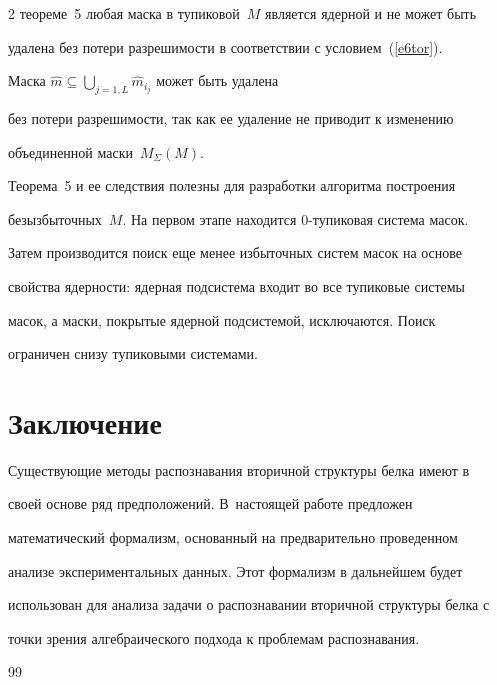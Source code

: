 \begin{multicols}{2}
теореме~5 любая маска в тупиковой~$M$ является ядерной и не может быть 

удалена без потери разрешимости в соответствии с условием~(\ref{e6tor}). 

Маска $\hat{m}\subseteq \bigcup\limits_{j=1,L} \hat{m}_{i_j}$ может быть удалена 

без потери разрешимости, так как ее удаление не приводит к изменению 

объединенной маски~$M_\Sigma (M)$.



\medskip



    Теорема~5 и ее следствия полезны для разработки алгоритма построения 

безызбыточных~$M$. На первом этапе находится 0-тупиковая система масок. 

Затем производится поиск еще менее избыточных систем масок на основе 

свойства ядерности: ядерная подсистема входит во все тупиковые системы 

масок, а маски, покрытые ядерной подсистемой, исключаются. Поиск 

ограничен снизу тупиковыми системами. 



\section{Заключение}



Существующие методы распознавания вторичной структуры белка имеют в 

своей основе ряд предположений. В~настоящей работе предложен 

математический формализм, основанный на предварительно проведенном 

анализе экспериментальных данных. Этот формализм в дальнейшем будет 

использован для анализа задачи о распознавании вторичной структуры белка с 

точки зрения ал\-геб\-раи\-че\-ско\-го подхода к проблемам распознавания. 



{\small\frenchspacing

{\baselineskip=11.8pt


\begin{thebibliography}{99}




\end{thebibliography}}}
\end{multicols}
